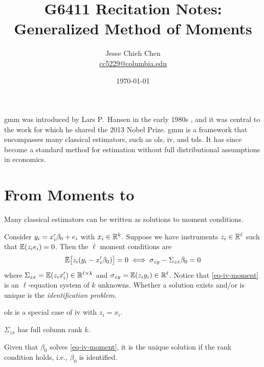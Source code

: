 \documentclass[a4paper,12pt]{article}
\title{G6411 Recitation Notes: Generalized Method of Moments}
\author{Jesse Chieh Chen\\\href{mailto:cc5229@columbia.edu}{cc5229@columbia.edu}}
\date{\today}
\begin{document}
\maketitle

\begin{remark}
	\gls{gmm} was introduced by Lars P.\ Hansen in the early 1980s \parencite{hansen-1982},
	and it was central to the work for which he shared the 2013 Nobel Prize.
	\gls{gmm} is a framework that encompasses many classical estimators, such as \gls{ols}, \gls{iv}, and \gls{tsls}.
	It has since become a standard method for estimation without full distributional assumptions in economics.
\end{remark}

\section{From Moments to }

Many classical estimators can be written as solutions to moment conditions.

\begin{example}[\gls{iv}]
	Consider $y_i=x_i^{\prime}\beta_0+e_i$ with $x_i\in\mathbb{R}^k$.
	Suppose we have instruments $z_i\in\mathbb{R}^\ell$ such that $\operatorname{\mathbb{E}}(z_ie_i)=0$.
	Then the $\ell$ moment conditions are
	\begin{align}\label{eq-iv-moment}
		\operatorname{\mathbb{E}}\bigl[z_i(y_i-x_i^{\prime}\beta_0)\bigr]=0
		\iff
		\sigma_{zy} - \Sigma_{zx}\beta_0 = 0
	\end{align}
	where $\Sigma_{zx}=\operatorname{\mathbb{E}}(z_ix_i^{\prime})\in\mathbb{R}^{\ell\times k}$ and $\sigma_{zy}=\operatorname{\mathbb{E}}(z_iy_i)\in\mathbb{R}^{\ell}$.
	Notice that \eqref{eq-iv-moment} is an $\ell$-equation system of $k$ unknowns.
	Whether a solution exists and/or is unique is the \emph{identification problem}.
\end{example}

\begin{remark}
	\gls{ols} is a special case of \gls{iv} with $z_i=x_i$.
\end{remark}

\begin{definition}\label{def-rank-condition}
	$\Sigma_{zx}$ has full column rank $k$.
\end{definition}

\begin{remark}
	Given that $\beta_0$ solves \eqref{eq-iv-moment}, it is the unique solution if the rank condition holds, i.e., $\beta_0$ is identified.
\end{remark}
\end{document}
